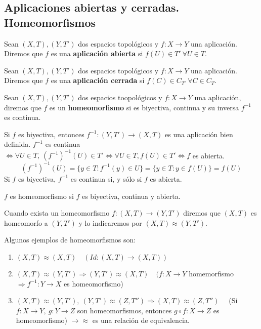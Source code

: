 \subsection{Aplicaciones abiertas y cerradas. Homeomorfismos}
\begin{ndef}
  Sean $(X,T), (Y,T')$ dos espacios topológicos y $f:X \to Y$ una aplicación. Diremos que $f$ es una \textbf{aplicación abierta} si $f(U) \in T'\ \forall U \in T$.
\end{ndef}
\begin{ndef}
  Sean $(X,T), (Y,T')$ dos espacios topológicos y $f:X \to Y$ una aplicación. Diremos que $f$ es una \textbf{aplicación cerrada} si $f(C) \in C_{T'}\ \forall C \in C_T$.
\end{ndef}

\begin{ndef}[Homeomorfismo]
  Sean $(X,T),(Y,T')$ dos espacios toopológicos y $f:X \to Y$ una aplicación, diremos que $f$ es un \textbf{homeomorfismo} si es biyectiva, continua y su inversa $f^{-1}$ es continua.
\end{ndef}
Si $f$ es biyectiva, entonces $f^{-1}:(Y,T') \to (X,T)$ es una aplicación bien definida. $f^{-1}$ es continua $\Leftrightarrow \forall U \in T,\ (f^{-1})^{-1}(U) \in T' \Leftrightarrow \forall U \in T, f(U) \in T' \Leftrightarrow f$ es abierta.
\[(f^{-1})^{-1}(U) = \{y \in T : f^{-1}(y) \in U\} = \{y \in T : y \in f(U)\} = f(U)\]
Si $f$ es biyectiva, $f^{-1}$ es continua si, y sólo si $f$ es abierta.
\begin{note}
$f$ es homeomorfismo si $f$ es biyectiva, continua y abierta.
\end{note}
\begin{ndef}
  Cuando exista un homeomorfismo $f: (X,T) \to (Y,T')$ diremos que $(X,T)$ es homeomorfo a $(Y,T')$ y lo indicaremos por $(X,T) \approx (Y,T')$.
\end{ndef}
\begin{exmp}
  Algunos ejemplos de homeomorfismos son:
  \begin{enumerate}
      \item $(X,T) \approx (X,T) \quad (Id: (X,T) \to (X,T))$
      \item $(X,T) \approx (Y,T') \Rightarrow (Y,T') \approx (X,T) \quad (f:X \to Y$ homemorfismo $\Rightarrow f^{-1}: Y \to X$ es homeomorfismo)
      \item $(X,T) \approx (Y,T'),\ (Y,T') \approx (Z,T'') \Rightarrow (X,T) \approx (Z,T'') \quad$ (Si $f: X \to Y,\ g:Y \to Z$ son homeomorfismos, entonces $g \circ f:X \to Z$ es homeomorfismo) $\rightarrow \approx$ es una relación de equivalencia.
  \end{enumerate}
\end{exmp}

